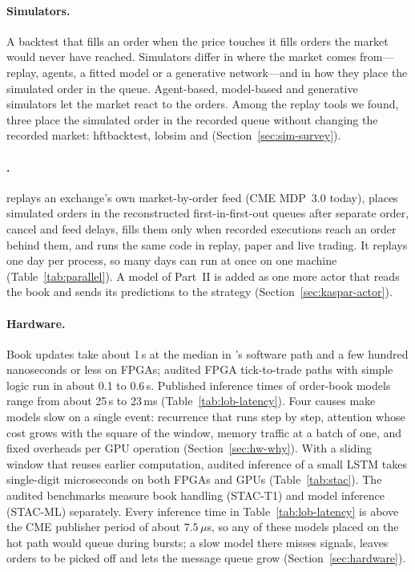 \paragraph{Simulators.} A backtest that fills an order when the price touches it fills orders the market would never
have reached. Simulators differ in where the market comes from---replay, agents, a fitted model or a generative
network---and in how they place the simulated order in the queue. Agent-based, model-based and generative simulators
let the market react to the orders. Among the replay
tools we found, three place the simulated order in the recorded queue without changing the recorded market: hftbacktest,
lobsim and \kasparhft{} (Section~\ref{sec:sim-survey}).

\paragraph{\kasparhft{}.} \kasparhft{} replays an exchange's own market-by-order feed (CME MDP~3.0 today), places simulated orders
in the reconstructed first-in-first-out queues after separate order, cancel and feed delays, fills them only when
recorded executions reach an order behind them, and runs the same code in replay, paper and live trading. It replays
one day per process, so many days can run at once on one machine (Table~\ref{tab:parallel}). A model of Part~II is added as one more actor that reads the book
and sends its predictions to the strategy (Section~\ref{sec:kaspar-actor}).

\paragraph{Hardware.} Book updates take about 1\,\textmu s at the median in \kasparhft{}'s software path and a few hundred nanoseconds or
less on FPGAs; audited FPGA tick-to-trade paths with simple logic run in about 0.1 to 0.6\,\textmu s. Published
inference times of order-book models range from about 25\,\textmu s to 23\,ms (Table~\ref{tab:lob-latency}). Four
causes make models slow on a single event: recurrence that runs step by step, attention whose cost grows with the
square of the window, memory traffic at a batch of one, and fixed overheads per GPU operation
(Section~\ref{sec:hw-why}). With a sliding window that reuses earlier computation, audited inference of a small LSTM
takes single-digit microseconds on both FPGAs and GPUs (Table~\ref{tab:stac}). The audited benchmarks measure book handling (STAC-T1) and model inference (STAC-ML) separately. Every inference time in Table~\ref{tab:lob-latency} is above the CME publisher period of about $7.5\,\mu$s, so
any of these models placed on the hot path would queue during bursts; a slow model there misses signals, leaves
orders to be picked off and lets the message queue grow (Section~\ref{sec:hardware}).
